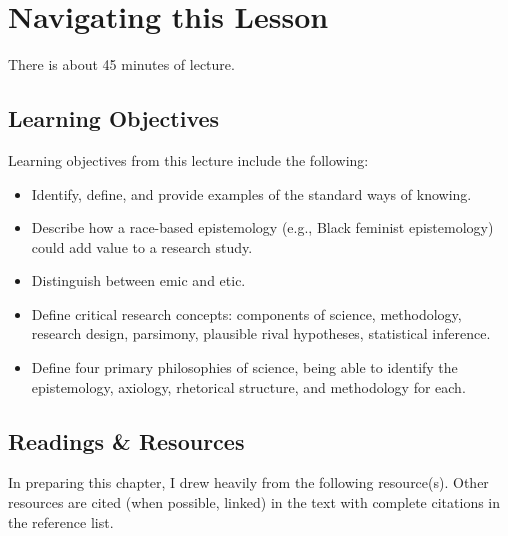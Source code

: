 \documentclass[
  english,
]{book}
\providecommand{\tightlist}{%
  \setlength{\itemsep}{0pt}\setlength{\parskip}{0pt}}
\begin{document}
\hypertarget{navigating-this-lesson-1}{%
\section{Navigating this Lesson}\label{navigating-this-lesson-1}}

There is about 45 minutes of lecture.

\hypertarget{learning-objectives-1}{%
\subsection{Learning Objectives}\label{learning-objectives-1}}

Learning objectives from this lecture include the following:

\begin{itemize}
\tightlist
\item
  Identify, define, and provide examples of the standard ways of knowing.
\item
  Describe how a race-based epistemology (e.g., Black feminist epistemology) could add value to a research study.
\item
  Distinguish between emic and etic.
\item
  Define critical research concepts: components of science, methodology, research design, parsimony, plausible rival hypotheses, statistical inference.
\item
  Define four primary philosophies of science, being able to identify the epistemology, axiology, rhetorical structure, and methodology for each.
\end{itemize}

\hypertarget{readings-resources-1}{%
\subsection{Readings \& Resources}\label{readings-resources-1}}

In preparing this chapter, I drew heavily from the following resource(s). Other resources are cited (when possible, linked) in the text with complete citations in the reference list.
\end{document}
